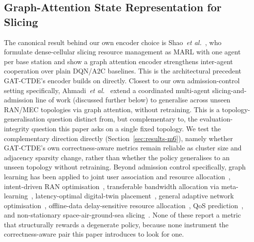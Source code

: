 \documentclass[journal]{IEEEtran}
\begin{document}
\subsection{Graph-Attention State Representation for Slicing}
The canonical result behind our own encoder choice is
Shao~\emph{et al.}~\cite{shao2021gatmarl}, who formulate dense-cellular
slicing resource management as MARL with one agent per base station and
show a graph attention encoder strengthens inter-agent cooperation over
plain DQN/A2C baselines. This is the architectural precedent GAT-CTDE's
encoder builds on directly. Closest to our own admission-control
setting specifically, Ahmadi~\emph{et al.}~\cite{ahmadi2024generalizable}
extend a coordinated multi-agent slicing-and-admission line of work
(discussed further below) to generalise across unseen RAN/MEC
topologies via graph attention, without retraining. This is a topology-
generalisation question distinct from, but complementary to, the
evaluation-integrity question this paper asks on a single fixed
topology. We test the complementary direction directly
(Section~\ref{sec:results-m6}), namely whether GAT-CTDE's own
correctness-aware metrics remain reliable as cluster size and adjacency
sparsity change, rather than whether the policy generalises to an
unseen topology without retraining. Beyond admission control specifically, graph
learning has been applied to joint user association and resource
allocation~\cite{tran2026gnnppo}, intent-driven RAN
optimisation~\cite{silva2025gnnintent}, transferable bandwidth
allocation via meta-learning~\cite{hao2024html}, latency-optimal
digital-twin placement~\cite{zhu2025hgatdt}, general adaptive network
optimisation~\cite{kurapati2025hybridgnn}, offline-data delay-sensitive
resource allocation~\cite{jing2025gnnoffline}, QoS
prediction~\cite{huang2025qosgdrl}, and non-stationary
space-air-ground-sea slicing~\cite{asheralieva2024admmgnn}. None of
these report a metric that structurally rewards a degenerate policy,
because none instrument the correctness-aware pair this paper
introduces to look for one.
\end{document}
